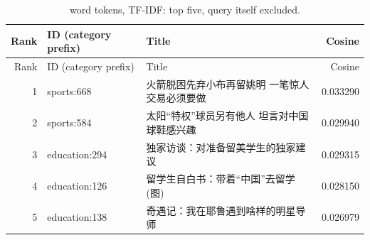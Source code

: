 {\small\renewcommand{\arraystretch}{1.05}
\begin{longtable}{rp{}p{}r}
\caption{word tokens, TF-IDF: top five, query itself excluded.}\\
\toprule
Rank & ID (category prefix) & Title & Cosine \\ \midrule\endfirsthead
\toprule
Rank & ID (category prefix) & Title & Cosine \\ \midrule\endhead
1 & sports:668 & 火箭脱困先弃小布再留姚明 一笔惊人交易必须要做 & 0.033290 \\
2 & sports:584 & 太阳“特权”球员另有他人 坦言对中国球鞋感兴趣 & 0.029940 \\
3 & education:294 & 独家访谈：对准备留美学生的独家建议 & 0.029315 \\
4 & education:126 & 留学生自白书：带着“中国”去留学(图) & 0.028150 \\
5 & education:138 & 奇遇记：我在耶鲁遇到啥样的明星导师 & 0.026979 \\
\bottomrule
\end{longtable}
}
